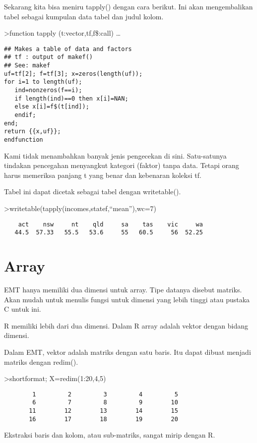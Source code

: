 \documentclass[
]{book}
\begin{document}
Sekarang kita bisa meniru tapply() dengan cara berikut. Ini akan mengembalikan tabel sebagai kumpulan data tabel dan judul kolom.

\textgreater function tapply (t:vector,tf,f\$:call) \ldots{}

\begin{verbatim}
## Makes a table of data and factors
## tf : output of makef()
## See: makef
uf=tf[2]; f=tf[3]; x=zeros(length(uf));
for i=1 to length(uf);
   ind=nonzeros(f==i);
   if length(ind)==0 then x[i]=NAN;
   else x[i]=f$(t[ind]);
   endif;
end;
return {{x,uf}};
endfunction
\end{verbatim}

Kami tidak menambahkan banyak jenis pengecekan di sini. Satu-satunya tindakan pencegahan menyangkut kategori (faktor) tanpa data. Tetapi orang harus memeriksa panjang t yang benar dan kebenaran koleksi tf.

Tabel ini dapat dicetak sebagai tabel dengan writetable().

\textgreater writetable(tapply(incomes,statef,``mean''),wc=7)

\begin{verbatim}
    act    nsw     nt    qld     sa    tas    vic     wa
   44.5  57.33   55.5   53.6     55   60.5     56  52.25
\end{verbatim}

\chapter{Array}\label{array}

EMT hanya memiliki dua dimensi untuk array. Tipe datanya disebut matriks. Akan mudah untuk menulis fungsi untuk dimensi yang lebih tinggi atau pustaka C untuk ini.

R memiliki lebih dari dua dimensi. Dalam R array adalah vektor dengan bidang dimensi.

Dalam EMT, vektor adalah matriks dengan satu baris. Itu dapat dibuat menjadi matriks dengan redim().

\textgreater shortformat; X=redim(1:20,4,5)

\begin{verbatim}
        1         2         3         4         5 
        6         7         8         9        10 
       11        12        13        14        15 
       16        17        18        19        20 
\end{verbatim}

Ekstraksi baris dan kolom, atau sub-matriks, sangat mirip dengan R.
\end{document}
